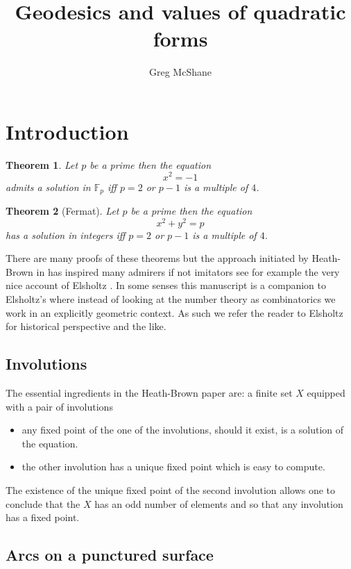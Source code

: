 \documentclass[12pt,a4paper]{amsart}
\title{Geodesics and values of quadratic forms}
\author[McShane]{Greg McShane}
\newtheorem{thm}{Theorem}[section]
\def\fp{\mathbb{F}_p}
\begin{document}
\maketitle

\section{Introduction}

	

\begin{thm}\label{triv}
Let $p$ be a prime then the equation
$$x^2 = -1$$
admits a solution in $\fp$ iff 
$p =2$ or $p-1$ is a multiple of $4$.
\end{thm}


\begin{thm}[Fermat]\label{main}
Let $p$ be a prime then the equation
$$x^2 + y^2 = p $$
has a solution in integers  iff  $p =2$ or $p-1$ is a multiple of $4$.
\end{thm}

There are many proofs of these theorems but the approach initiated
by Heath-Brown in \cite{heath} has inspired many admirers if not 
imitators see for example the very nice account of Elsholtz \cite{elsholtz}.
In some senses this manuscript is a companion 
to Elsholtz's where instead of looking at the number theory as combinatorics we work in an explicitly geometric context.
As such we refer the reader to Elsholtz for historical perspective
and the like.

\subsection{Involutions}

The essential ingredients in the Heath-Brown paper are:
a finite set $X$ equipped with a pair of involutions
\begin{itemize}
	\item any fixed point of the one of the involutions, should it exist, is a solution of the equation.
	\item the other involution has a unique fixed point which is easy to compute.
\end{itemize}

The existence of the unique fixed point of the second involution
allows one to conclude that  the $X$ has an odd number of elements
and so that any involution has a fixed point.

\subsection{Arcs on a punctured surface}
\end{document}
